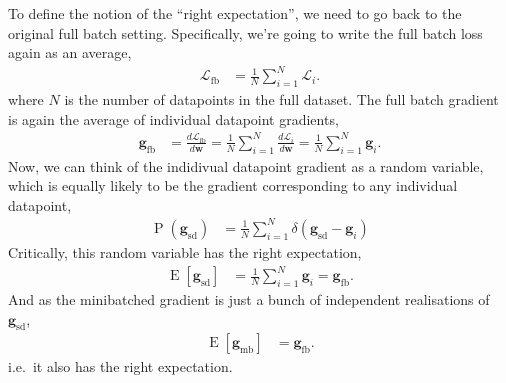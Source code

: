 \documentclass{article}
\newcommand{\dt}[2][]{\frac{d #1}{d #2}}
\newcommand{\dLi}{\dt[{\Li}]}
\newcommand{\dLfb}{\dt[{\Lfb}]}
\newcommand{\bracket}[3]{\left#1 #3 \right#2}
\newcommand{\sqb}{\bracket{[}{]}}
\renewcommand{\b}{\bracket{(}{)}}
\newcommand{\0}{\mathbf{0}}
\newcommand{\g}{\mathbf{g}}
\newcommand{\gfb}{\g_\text{fb}}
\newcommand{\gmb}{\g_\text{mb}}
\newcommand{\gsd}{\g_\text{sd}}
\renewcommand{\P}{\operatorname{P}\b}
\newcommand{\w}{\mathbf{w}}
\renewcommand{\L}{\mathcal{L}}
\newcommand{\Li}{\L_i}
\newcommand{\Lfb}{\L_\text{fb}}
\newcommand{\E}{\operatorname{E}\sqb}
\newcommand{\fbsize}{N}
\newcommand{\fbavg}{\tfrac{1}{\fbsize} \sum_{i=1}^{\fbsize}}
\begin{document}
To define the notion of the ``right expectation'', we need to go back to the original full batch setting.
Specifically, we're going to write the full batch loss again as an average,
\begin{align}
  \Lfb &= \fbavg \Li.
\end{align}
where $N$ is the number of datapoints in the full dataset.
The full batch gradient is again the average of individual datapoint gradients,
\begin{align}
  \gfb &= \dLfb{\w} = \fbavg \dLi{\w} = \fbavg \g_i.
\end{align}
Now, we can think of the indidivual datapoint gradient as a random variable, which is equally likely to be the gradient corresponding to any individual datapoint,
\begin{align}
  \P{\gsd} &= \fbavg \delta(\gsd - \g_i)
\end{align}
Critically, this random variable has the right expectation,
\begin{align}
  \E{\gsd} &= \fbavg \g_i = \gfb.
\end{align}
And as the minibatched gradient is just a bunch of independent realisations of $\gsd$, 
\begin{align}
  \E{\gmb} &= \gfb.
\end{align}
i.e.\ it also has the right expectation.
\end{document}

